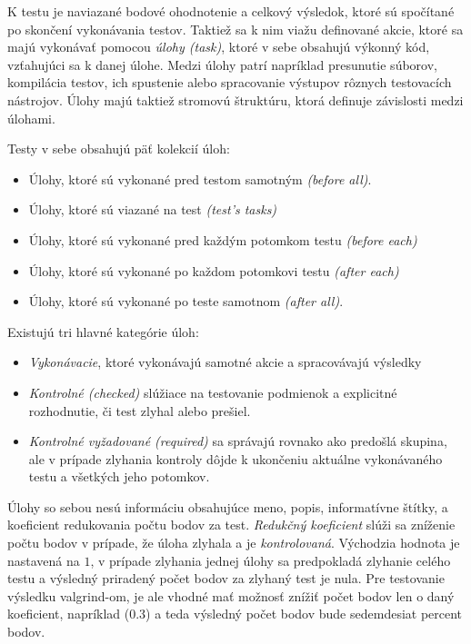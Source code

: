 \documentclass[
  digital, %
  twoside, %
  table,   %
  lof,     %
  lot,     %
]{fithesis3}
\begin{document}
K testu je naviazané bodové ohodnotenie a celkový výsledok, ktoré sú spočítané po skončení vykonávania testov. Taktiež sa k nim viažu definované akcie, ktoré sa majú vykonávať pomocou \emph{úlohy (task)}, ktoré v sebe obsahujú výkonný kód, vzťahujúci sa k danej úlohe. Medzi úlohy patrí napríklad presunutie súborov, kompilácia testov, ich spustenie alebo spracovanie výstupov rôznych testovacích nástrojov. Úlohy majú taktiež stromovú štruktúru, ktorá definuje závislosti medzi úlohami.

Testy v sebe obsahujú päť kolekcií úloh:
\begin{itemize}
    \item Úlohy, ktoré sú vykonané pred testom samotným \emph{(before all)}.
    \item Úlohy, ktoré sú viazané na test \emph{(test's tasks)}
    \item Úlohy, ktoré sú vykonané pred každým potomkom testu \emph{(before each)} 
    \item Úlohy, ktoré sú vykonané po každom potomkovi testu \emph{(after each)}
    \item Úlohy, ktoré sú vykonané po teste samotnom \emph{(after all)}.
\end{itemize}

Existujú tri hlavné kategórie úloh:
\begin{itemize}
    \item \emph{Vykonávacie}, ktoré vykonávajú samotné akcie a spracovávajú výsledky
    \item \emph{Kontrolné (checked)} slúžiace na testovanie podmienok a explicitné rozhodnutie, či test zlyhal alebo prešiel.
    \item \emph{Kontrolné vyžadované (required)} sa správajú rovnako ako predošlá skupina, ale v prípade zlyhania kontroly dôjde k ukončeniu aktuálne vykonávaného testu a všetkých jeho potomkov.
\end{itemize}


Úlohy so sebou nesú informáciu obsahujúce meno, popis, informatívne štítky, a koeficient redukovania počtu bodov za test. \emph{Redukčný koeficient} slúži sa zníženie počtu bodov v prípade, že úloha zlyhala a je \emph{kontrolovaná}. Východzia hodnota je nastavená na $1$, v prípade zlyhania jednej úlohy sa predpokladá zlyhanie celého testu a výsledný priradený počet bodov za zlyhaný test je nula. Pre testovanie výsledku valgrind-om, je ale vhodné mať možnosť znížiť počet bodov len o daný koeficient, napríklad (0.3) a teda výsledný počet bodov bude sedemdesiat percent bodov.
\end{document}
